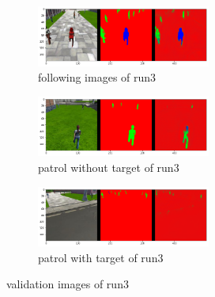 \documentclass[paper=a4, fontsize=11pt]{scrartcl} %
\numberwithin{equation}{section} %
\numberwithin{figure}{section} %
\numberwithin{table}{section} %
\begin{document}
\begin{figure}[ht]
	\begin{subfigure}{0.33\textwidth}
	\includegraphics[width=0.9\linewidth, height=2cm]{./imgs/following_images3.png} 
	\caption{following images of run3}
	\label{fig:subfollowing_images3}
	\end{subfigure}
	\begin{subfigure}{0.33\textwidth}
	\includegraphics[width=0.9\linewidth, height=2cm]{./imgs/patrol_non_targ3.png}
	\caption{patrol without target of run3}
	\label{fig:subpatrol_non_targ3}
	\end{subfigure}
	\begin{subfigure}{0.33\textwidth}
	\includegraphics[width=0.9\linewidth, height=2cm]{./imgs/patrol_with_targ3.png}
	\caption{patrol with target of run3}
	\label{fig:subpatrol_with_targ3}
	\end{subfigure}

	\caption{validation images of run3}
	\label{fig:outputimages3}
\end{figure}
\end{document}
